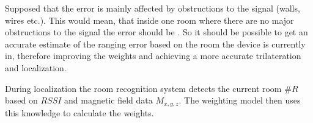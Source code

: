 Supposed that the error is mainly affected by obstructions to the signal (walls, wires etc.). This would mean, that inside one room where there are no major obstructions to the signal the error should be . So it should be possible to get an accurate estimate of the ranging error based on the room the device is currently in, therefore improving the weights and achieving a more accurate trilateration and localization.

During localization the room recognition system detects the current room \(\#R\) based on \(RSSI\) and magnetic field data \(M_{x,y,z}\). The weighting model then uses this knowledge to calculate the weights. 
